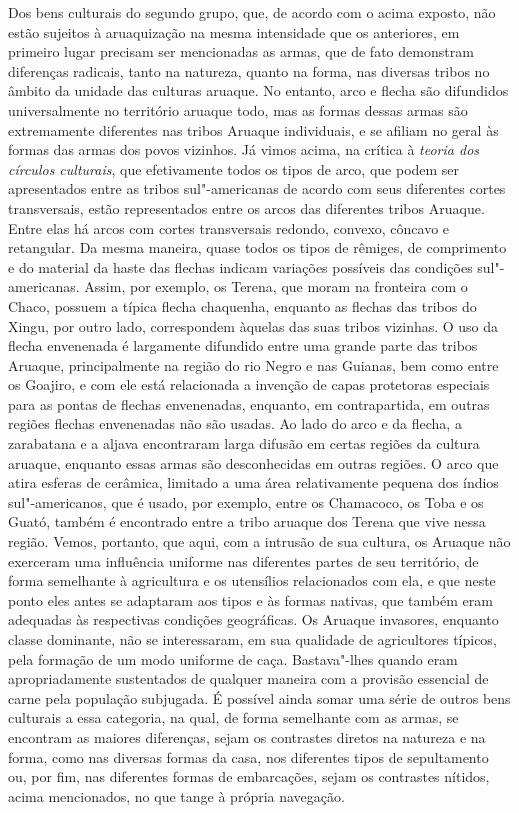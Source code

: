 Dos bens culturais do segundo grupo, que, de acordo com o acima exposto,
não estão sujeitos à aruaquização na mesma intensidade que os
anteriores, em primeiro lugar precisam ser mencionadas as armas, que de
fato demonstram diferenças radicais, tanto na natureza, quanto na
forma, nas diversas tribos no âmbito da unidade das culturas aruaque. No
entanto, arco e flecha são difundidos universalmente no território
aruaque todo, mas as formas dessas armas são extremamente diferentes nas
tribos Aruaque individuais, e se afiliam no geral às formas das armas
dos povos vizinhos. Já vimos acima, na crítica à \textit{teoria dos círculos
culturais}, que efetivamente todos os tipos de arco, que podem ser
apresentados entre as tribos sul"-americanas de acordo com seus
diferentes cortes transversais, estão representados entre os arcos das
diferentes tribos Aruaque. Entre elas há arcos com cortes transversais
redondo, convexo, côncavo e retangular. Da mesma maneira, quase todos
os tipos de rêmiges, de comprimento e do material da haste das flechas
indicam variações possíveis das condições sul"-americanas. Assim, por
exemplo, os Terena, que moram na fronteira com o Chaco, possuem a típica
flecha chaquenha, enquanto as flechas das tribos do Xingu, por outro
lado, correspondem àquelas das suas tribos vizinhas. O uso da flecha
envenenada é largamente difundido entre uma grande parte das tribos
Aruaque, principalmente na região do rio Negro e nas Guianas, bem como
entre os Goajiro, e com ele está relacionada a invenção de capas
protetoras especiais para as pontas de flechas envenenadas, enquanto,
em contrapartida, em outras regiões flechas envenenadas não são usadas.
Ao lado do arco e da flecha, a zarabatana e a aljava encontraram larga
difusão em certas regiões da cultura aruaque, enquanto essas armas são
desconhecidas em outras regiões. O arco que atira esferas de cerâmica,
limitado a uma área relativamente pequena dos índios sul"-americanos, que é usado,
por exemplo, entre os Chamacoco, os Toba e os Guató, também é encontrado
entre a tribo aruaque dos Terena que vive nessa região. Vemos, portanto,
que aqui, com a intrusão de sua cultura, os Aruaque não exerceram uma
influência uniforme nas diferentes partes de seu território, de forma
semelhante à agricultura e os utensílios relacionados com ela, e que
neste ponto eles antes se adaptaram aos tipos e às formas nativas, que
também eram adequadas às respectivas condições geográficas. Os Aruaque
invasores, enquanto classe dominante, não se interessaram, em sua
qualidade de agricultores típicos, pela formação de um modo uniforme de
caça. Bastava"-lhes quando eram apropriadamente sustentados de qualquer
maneira com a provisão essencial de carne pela população subjugada. É
possível ainda somar uma série de outros bens culturais a essa
categoria, na qual, de forma semelhante com as armas, se encontram as
maiores diferenças, sejam os contrastes diretos na natureza e na forma,
como nas diversas formas da casa, nos diferentes tipos de sepultamento
ou, por fim, nas diferentes formas de embarcações, sejam os contrastes
nítidos, acima mencionados, no que tange à própria navegação.

